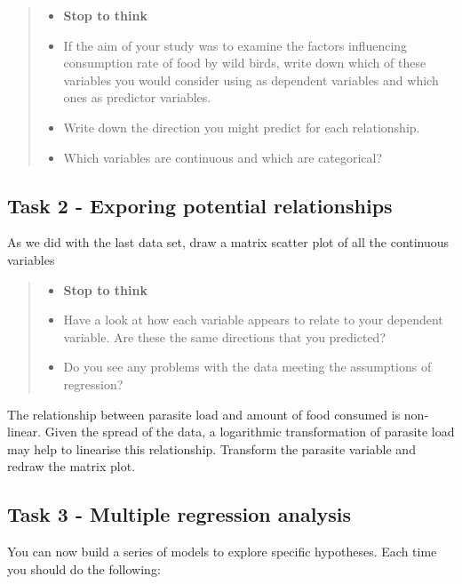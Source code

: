 \documentclass[
]{book}
\providecommand{\tightlist}{%
  \setlength{\itemsep}{0pt}\setlength{\parskip}{0pt}}
\begin{document}
\begin{quote}
\begin{itemize}
\tightlist
\item
  \textbf{Stop to think}
\item
  If the aim of your study was to examine the factors influencing consumption rate of food by wild birds, write down which of these variables you would consider using as dependent variables and which ones as predictor variables.
\item
  Write down the direction you might predict for each relationship.
\item
  Which variables are continuous and which are categorical?
\end{itemize}
\end{quote}

\subsection{Task 2 - Exporing potential relationships}\label{task-2---exporing-potential-relationships}

As we did with the last data set, draw a matrix scatter plot of all the continuous variables

\begin{quote}
\begin{itemize}
\tightlist
\item
  \textbf{Stop to think}
\item
  Have a look at how each variable appears to relate to your dependent variable. Are these the same directions that you predicted?
\item
  Do you see any problems with the data meeting the assumptions of regression?
\end{itemize}
\end{quote}

The relationship between parasite load and amount of food consumed is non-linear. Given the spread of the data, a logarithmic transformation of parasite load may help to linearise this relationship. Transform the parasite variable and redraw the matrix plot.

\subsection{Task 3 - Multiple regression analysis}\label{task-3---multiple-regression-analysis}

You can now build a series of models to explore specific hypotheses. Each time you should do the following:
\end{document}
